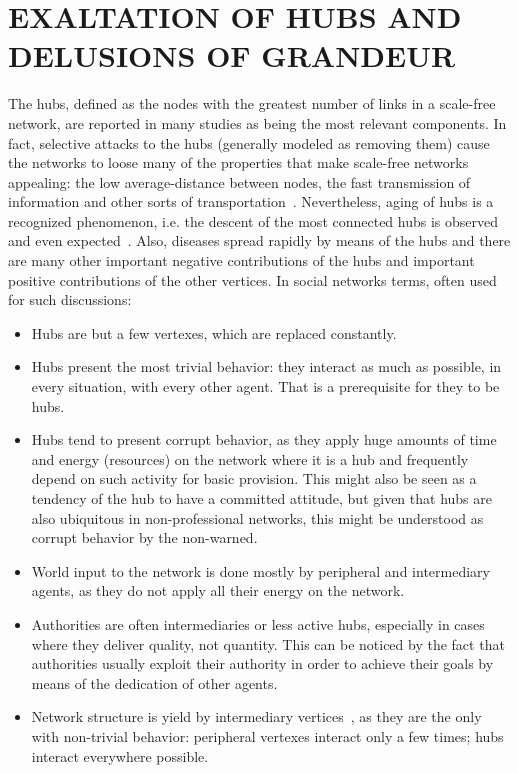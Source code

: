 \documentclass[12pt,fleqn]{article}
\begin{document}
\section{EXALTATION OF HUBS AND DELUSIONS OF GRANDEUR}\label{sec:delusion}
The hubs, defined as the nodes with the greatest number of links in a scale-free network,
are reported in many studies as being the most relevant components.
In fact, selective attacks to the hubs (generally modeled as removing them)
cause the networks to loose many of the properties that make scale-free networks
appealing: the low average-distance between nodes, the fast transmission of information
and other sorts of transportation~\citep{networks}.
Nevertheless, aging of hubs is a recognized phenomenon,
i.e. the descent of the most connected hubs is observed
and even expected~\citep{aging}.
Also, diseases spread rapidly by means of the hubs 
and there are many other important negative contributions
of the hubs and important positive contributions of the
other vertices.
In social networks terms, often used for such discussions:
\begin{itemize}
    \item Hubs are but a few vertexes, which are replaced constantly.
    \item Hubs present the most trivial behavior:
	    they interact as much as possible, in every situation, with every other agent.
		That is a prerequisite for they to be hubs.
    \item Hubs tend to present corrupt behavior,
	    as they apply huge amounts of time and energy (resources)
		on the network where it is a hub and frequently depend on such activity for basic provision.
		This might also be seen as a tendency of the hub to have a committed attitude,
		but given that hubs are also ubiquitous in non-professional networks,
		this might be understood as corrupt behavior by the non-warned.
    \item World input to the network is done mostly by peripheral and intermediary agents,
	    as they do not apply all their energy on the network.
    \item Authorities are often intermediaries or less active hubs,
	    especially in cases where they deliver quality, not quantity.
		This can be noticed by the fact that authorities usually exploit their authority
		in order to achieve their goals by means of the dedication of other agents.
	\item Network structure is yield by intermediary vertices~\citep{fabbri2},
	    as they are the only with non-trivial behavior:
		peripheral vertexes interact only a few times; hubs interact everywhere possible.
\end{itemize}
\end{document}
